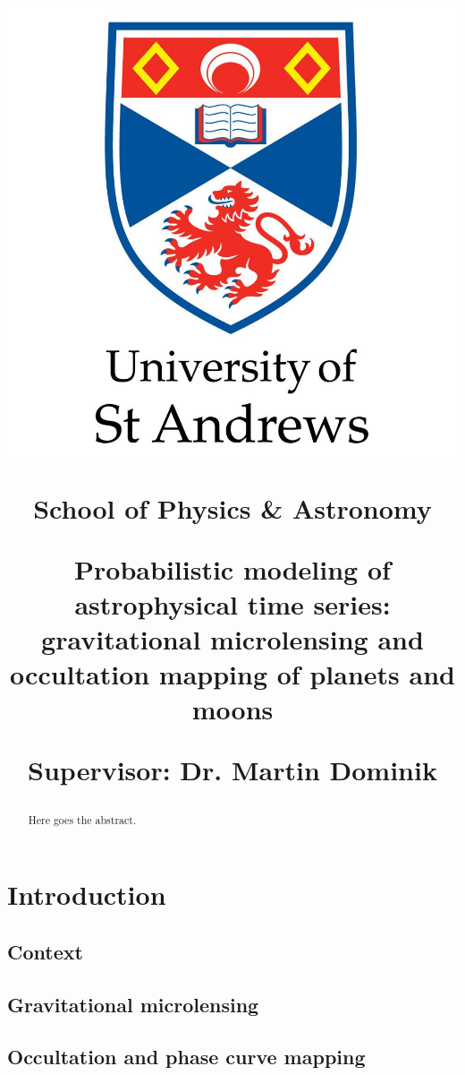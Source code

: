 \documentclass[]{report}
\begin{document}
\title{\vspace{-15pt}\begin{center}\includegraphics[width=0.4\linewidth]{static/misc/logo.jpg}\end{center}
\vspace{20pt}
\begin{center}
School of Physics \& Astronomy
\end{center}
\vspace{20pt}
\begin{center}
\LARGE\textbf{Probabilistic modeling of astrophysical time series:
gravitational microlensing and occultation mapping of planets and moons}
\end{center}
\vspace{20pt}
\begin{center}
Supervisor: Dr. Martin Dominik
\end{center}
}

\maketitle
\tableofcontents

\begin{abstract}
    Here goes the abstract.
\end{abstract}

\clearpage
\thispagestyle{empty}

\chapter{Introduction}
\section{Context}
\section{Gravitational microlensing}
\section{Occultation and phase curve mapping}
\end{document}
